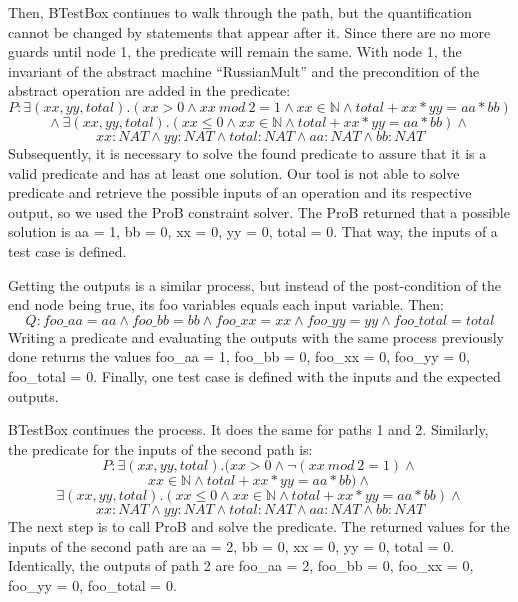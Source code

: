 \documentclass[runningheads]{llncs}
\begin{document}
\nolinebreak[4]
\noindent
Then, BTestBox continues to walk through the path, but the quantification cannot be changed by statements that appear after it. Since there are no more guards until node 1, the predicate will remain the same. With node 1, the invariant of the abstract machine ``RussianMult'' and the precondition of the abstract operation are added in the predicate: \nolinebreak[4]
\noindent
$$ {\displaystyle P: \exists(xx, yy, total).(xx > 0 \wedge xx\ mod\ 2 = 1 \wedge
 xx \in \mathbb{N} \wedge total + xx * yy = aa * bb)  }$$
$$ {\displaystyle \wedge \ \exists(xx, yy, total).(xx \leq 0 \wedge xx \in \mathbb{N} \wedge total + xx * yy = aa * bb) \wedge}$$
$$ {\displaystyle xx : NAT \wedge yy : NAT \wedge total : NAT \wedge aa : NAT \wedge bb : NAT}$$ \noindent \nolinebreak[4]
Subsequently, it is necessary to solve the found predicate to assure that it is a valid predicate and has at least one solution. Our tool is not able to solve predicate and retrieve the possible inputs of an operation and its respective output, so we used the ProB constraint solver. The ProB returned that a possible solution is aa = 1, bb = 0, xx = 0, yy = 0, total = 0. That way, the inputs of a test case is defined.

Getting the outputs is a similar process, but instead of the post-condition of the end node being true, its foo variables equals each input variable. Then:
\nolinebreak[4]
\noindent
$${\displaystyle Q : foo\_aa = aa \wedge foo\_bb = bb \wedge foo\_xx = xx \wedge
foo\_yy = yy \wedge foo\_total = total }$$
\nolinebreak[4]
\noindent
Writing a predicate and evaluating the outputs with the same process previously done returns the values foo\_aa = 1, foo\_bb = 0, foo\_xx = 0, foo\_yy = 0, foo\_total = 0. Finally, one test case is defined with the inputs and the expected outputs.

BTestBox continues the process. It does the same for paths 1 and 2. Similarly, the predicate for the inputs of the second path is:
\nolinebreak[4]
\noindent
$${\displaystyle P: \exists(xx, yy, total).(xx > 0 \wedge \neg(xx\ mod\ 2 = 1) \wedge }$$
$${\displaystyle xx \in \mathbb{N} \wedge total + xx * yy = aa * bb) \wedge }$$
$${\displaystyle \exists(xx, yy, total).(xx \leq 0 \wedge xx \in \mathbb{N} \wedge total + xx * yy = aa * bb) \wedge }$$
$${\displaystyle xx : NAT \wedge yy : NAT \wedge total : NAT \wedge aa : NAT \wedge bb : NAT} $$
\nolinebreak[4]
\noindent
The next step is to call ProB and solve the predicate. The returned values for the inputs of the second path are aa = 2, bb = 0, xx = 0, yy = 0, total = 0. Identically, the outputs of path 2 are foo\_aa = 2, foo\_bb = 0, foo\_xx = 0, foo\_yy = 0, foo\_total = 0.
\end{document}
